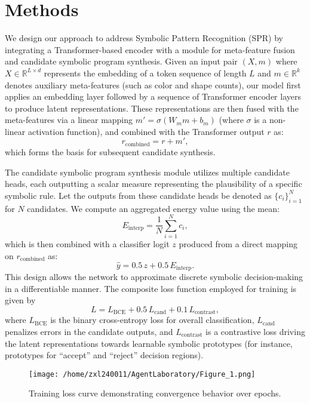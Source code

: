 \documentclass[11pt]{article}
\begin{document}
\section{Methods}
We design our approach to address Symbolic Pattern Recognition (SPR) by integrating a Transformer-based encoder with a module for meta-feature fusion and candidate symbolic program synthesis. Given an input pair \((X, m)\) where \(X \in \mathbb{R}^{L \times d}\) represents the embedding of a token sequence of length \(L\) and \(m \in \mathbb{R}^{k}\) denotes auxiliary meta-features (such as color and shape counts), our model first applies an embedding layer followed by a sequence of Transformer encoder layers to produce latent representations. These representations are then fused with the meta-features via a linear mapping \(m' = \sigma(W_m m + b_m)\) (where \(\sigma\) is a non-linear activation function), and combined with the Transformer output \(r\) as:
\[
r_{\text{combined}} = r + m',
\]
which forms the basis for subsequent candidate synthesis.

The candidate symbolic program synthesis module utilizes multiple candidate heads, each outputting a scalar measure representing the plausibility of a specific symbolic rule. Let the outputs from these candidate heads be denoted as \(\{c_i\}_{i=1}^{N}\) for \(N\) candidates. We compute an aggregated energy value using the mean:
\[
E_{\text{interp}} = \frac{1}{N} \sum_{i=1}^{N} c_i,
\]
which is then combined with a classifier logit \(z\) produced from a direct mapping on \(r_{\text{combined}}\) as:
\[
\hat{y} = 0.5\, z + 0.5\, E_{\text{interp}}.
\]
This design allows the network to approximate discrete symbolic decision-making in a differentiable manner. The composite loss function employed for training is given by
\[
L = L_{\text{BCE}} + 0.5\, L_{\text{cand}} + 0.1\, L_{\text{contrast}},
\]
where \(L_{\text{BCE}}\) is the binary cross-entropy loss for overall classification, \(L_{\text{cand}}\) penalizes errors in the candidate outputs, and \(L_{\text{contrast}}\) is a contrastive loss driving the latent representations towards learnable symbolic prototypes (for instance, prototypes for “accept” and “reject” decision regions).

\begin{figure}[h]
\caption{Training loss curve demonstrating convergence behavior over epochs.}
\centering
\texttt{[image: /home/zxl240011/AgentLaboratory/Figure\_1.png]}
\label{fig:fig1}
\end{figure}
\end{document}
